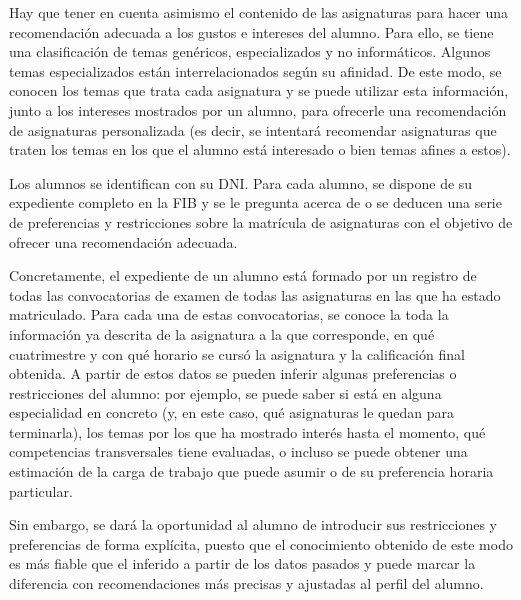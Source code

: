 Hay que tener en cuenta asimismo el contenido de las asignaturas para hacer 
una recomendación adecuada a los gustos e intereses del alumno. Para ello, 
se tiene una clasificación de temas genéricos, especializados y no 
informáticos. Algunos temas especializados están interrelacionados según su 
afinidad. De este modo, se conocen los temas que trata cada asignatura y se 
puede utilizar esta información, junto a los intereses mostrados por un 
alumno, para ofrecerle una recomendación de asignaturas personalizada (es 
decir, se intentará recomendar asignaturas que traten los temas en los que 
el alumno está interesado o bien temas afines a estos). 

Los alumnos se identifican con su DNI. Para cada alumno, se dispone de su 
expediente completo en la FIB y se le pregunta acerca de o se deducen una 
serie de preferencias y restricciones sobre la matrícula de asignaturas con 
el objetivo de ofrecer una recomendación adecuada.

Concretamente, el expediente de un alumno está formado por un registro de 
todas las convocatorias de examen de todas las asignaturas en las que ha 
estado matriculado. Para cada una de estas convocatorias, se conoce la 
toda la información ya descrita de la asignatura a la que corresponde, en qué 
cuatrimestre y con qué horario se cursó la asignatura y la calificación final 
obtenida. A partir de estos datos se pueden inferir algunas preferencias o 
restricciones del alumno: por ejemplo, se puede saber si está en alguna 
especialidad en concreto (y, en este caso, qué asignaturas le quedan para 
terminarla), los temas por los que ha mostrado interés hasta el momento, qué 
competencias transversales tiene evaluadas, o incluso se puede obtener una 
estimación de la carga de trabajo que puede asumir o de su preferencia horaria 
particular.

Sin embargo, se dará la oportunidad al alumno de introducir sus restricciones 
y preferencias de forma explícita, puesto que el conocimiento obtenido de este 
modo es más fiable que el inferido a partir de los datos pasados y puede 
marcar la diferencia con recomendaciones más precisas y ajustadas al perfil 
del alumno. 

